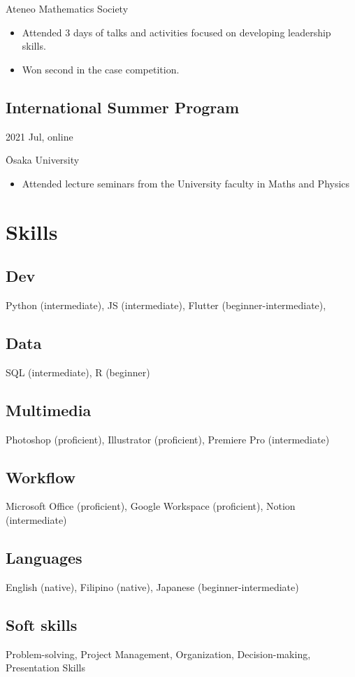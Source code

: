 \begin{multicols}{2}
\hfill Ateneo Mathematics Society

\begin{itemize}[noitemsep, topsep=0.25em]
\item Attended 3 days of talks and activities focused on developing leadership skills.

\item Won second in the case competition.

\end{itemize}

\subsection{International Summer Program}\hfill 2021 Jul, online

\hfill \={O}saka University

\begin{itemize}[noitemsep, topsep=0.25em]
\item Attended lecture seminars from the University faculty in Maths and Physics
\end{itemize}

\section{Skills}

\subsection{Dev}\quad Python (intermediate), JS (intermediate), Flutter (beginner-intermediate), 

\subsection{Data}\quad SQL (intermediate), R (beginner)

\subsection{Multimedia} \quad Photoshop (proficient), Illustrator (proficient), Premiere Pro (intermediate)

\subsection{Workflow} \quad Microsoft Office (proficient), Google Workspace (proficient), Notion (intermediate)

\subsection{Languages}\quad English (native), Filipino (native), Japanese (beginner-intermediate)

\subsection{Soft skills}\quad Problem-solving, Project Management, Organization, Decision-making, Presentation Skills
\end{multicols}
